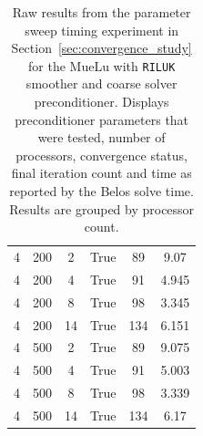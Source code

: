\begin{table}[H]
\begin{tabular}{cccccc}
		4             & 200                             & 2                        & True             & 89            & 9.07              \\
		4             & 200                             & 4                        & True             & 91            & 4.945             \\
		4             & 200                             & 8                        & True             & 98            & 3.345             \\
		4             & 200                             & 14                       & True             & 134           & 6.151             \\
		4             & 500                             & 2                        & True             & 89            & 9.075             \\
		4             & 500                             & 4                        & True             & 91            & 5.003             \\
		4             & 500                             & 8                        & True             & 98            & 3.339             \\
		4             & 500                             & 14                       & True             & 134           & 6.17              \\
		\bottomrule
	\end{tabular}
\caption{Raw results from the parameter sweep timing experiment in Section~\ref{sec:convergence_study} for the MueLu with \texttt{RILUK} smoother and coarse solver preconditioner. Displays preconditioner parameters that were tested, number of processors, convergence status, final iteration count and time as reported by the Belos solve time. Results are grouped by processor count.}
	\label{tab:muelu_results}
\end{table}

